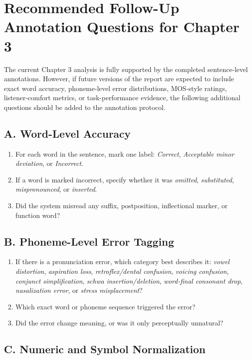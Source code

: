 \section*{Recommended Follow-Up Annotation Questions for Chapter 3}

The current Chapter 3 analysis is fully supported by the completed sentence-level annotations. However, if future versions of the report are expected to include exact word accuracy, phoneme-level error distributions, MOS-style ratings, listener-comfort metrics, or task-performance evidence, the following additional questions should be added to the annotation protocol.

\subsection*{A. Word-Level Accuracy}

\begin{enumerate}
\item For each word in the sentence, mark one label: \textit{Correct}, \textit{Acceptable minor deviation}, or \textit{Incorrect}.
\item If a word is marked incorrect, specify whether it was \textit{omitted}, \textit{substituted}, \textit{mispronounced}, or \textit{inserted}.
\item Did the system misread any suffix, postposition, inflectional marker, or function word?
\end{enumerate}

\subsection*{B. Phoneme-Level Error Tagging}

\begin{enumerate}
\item If there is a pronunciation error, which category best describes it: \textit{vowel distortion}, \textit{aspiration loss}, \textit{retroflex/dental confusion}, \textit{voicing confusion}, \textit{conjunct simplification}, \textit{schwa insertion/deletion}, \textit{word-final consonant drop}, \textit{nasalization error}, or \textit{stress misplacement}?
\item Which exact word or phoneme sequence triggered the error?
\item Did the error change meaning, or was it only perceptually unnatural?
\end{enumerate}

\subsection*{C. Numeric and Symbol Normalization}

